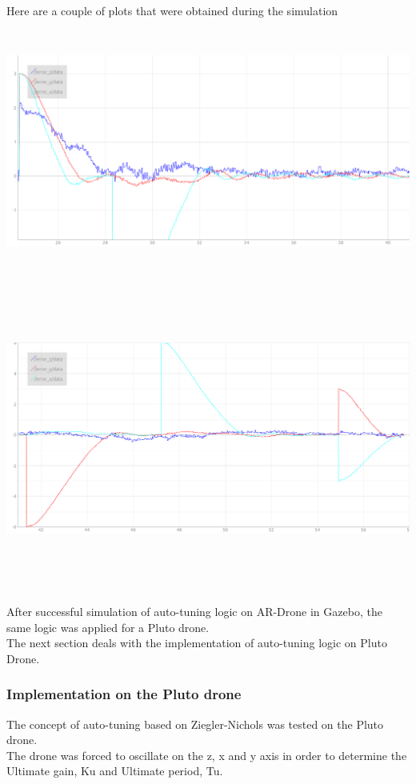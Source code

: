 \documentclass[a4paper,12pt,oneside]{book}
\begin{document}
Here are a couple of plots that were obtained during the simulation\\
\begin{flushleft}
\includegraphics[width = 15cm , height= 8cm]{auto-tuning-ARDrone.png}

\includegraphics[width = 15cm , height= 10cm]{auto-tuning-ARDrone_2.png}

\end{flushleft}
After successful simulation of auto-tuning logic on AR-Drone in Gazebo, the same logic was applied for a Pluto drone.\\
The next section deals with the implementation of auto-tuning logic on Pluto Drone.

\subsubsection{Implementation on the Pluto drone}
The concept of auto-tuning based on Ziegler-Nichols was tested on the Pluto drone.\\
The drone was forced to oscillate on the z, x and y axis in order to determine the Ultimate gain, Ku and Ultimate period, Tu.
\end{document}
